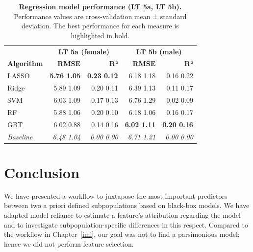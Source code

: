 \documentclass[
  oneside]{book}
\begin{document}
\begin{table}

\caption{\label{tab:09-performance-5}\textbf{Regression model performance (LT 5a, LT 5b).} Performance values are cross-validation mean ± standard deviation. The best performance for each measure is highlighted in bold.}
\centering
\begin{tabular}[t]{lrrrr}
\toprule
\multicolumn{1}{c}{\textbf{ }} & \multicolumn{2}{c}{\textbf{LT 5a (female)}} & \multicolumn{2}{c}{\textbf{LT 5b (male)}} \\
\cmidrule(l{3pt}r{3pt}){2-3} \cmidrule(l{3pt}r{3pt}){4-5}
\textbf{Algorithm} & \textbf{RMSE} & \textbf{R²} & \textbf{RMSE} & \textbf{R²}\\
\midrule
LASSO & \textbf{5.76 \textpm{} 1.05} & \textbf{0.23 \textpm{} 0.12} & 6.18 \textpm{} 1.18 & 0.16 \textpm{} 0.22\\
Ridge & 5.89 \textpm{} 1.09 & 0.20 \textpm{} 0.11 & 6.39 \textpm{} 1.13 & 0.11 \textpm{} 0.17\\
SVM & 6.03 \textpm{} 1.09 & 0.17 \textpm{} 0.13 & 6.76 \textpm{} 1.29 & 0.02 \textpm{} 0.09\\
RF & 5.88 \textpm{} 1.06 & 0.20 \textpm{} 0.10 & 6.18 \textpm{} 1.06 & 0.16 \textpm{} 0.17\\
GBT & 6.02 \textpm{} 0.88 & 0.14 \textpm{} 0.16 & \textbf{6.02 \textpm{} 1.11} & \textbf{0.20 \textpm{} 0.16}\\
\midrule
\addlinespace
\em{Baseline} & \em{6.48 \textpm{} 1.04} & \em{0.00 \textpm{} 0.00} & \em{6.71 \textpm{} 1.21} & \em{0.00 \textpm{} 0.00}\\
\bottomrule
\end{tabular}
\end{table}

\hypertarget{gender-conclusion}{%
\section{Conclusion}\label{gender-conclusion}}

We have presented a workflow to juxtapose the most important predictors between two a priori defined subpopulations based on black-box models.
We have adapted model reliance to estimate a feature's attribution regarding the model and to investigate subpopulation-specific differences in this respect.
Compared to the workflow in Chapter~\ref{iml}, our goal was not to find a parsimonious model; hence we did not perform feature selection.
\end{document}
